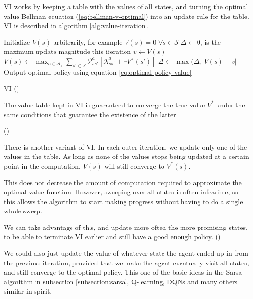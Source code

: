 \ac{VI} works by keeping a table with the values of all states, and
turning the optimal value Bellman equation (\ref{eq:bellman-v-optimal}) into an
update rule for the table. \ac{VI} is described in algorithm
\ref{alg:value-iteration}.

\begin{algorithm}
\begin{algorithmic}
\State Initialize $V(s)$ arbitrarily, for example $V(s)=0 \; \forall s\in\mathcal{S}$
\Repeat
  \State $\Delta \gets 0$, is the maximum update magnitude this iteration
    \State $v \gets V(s)$
    \State $V(s) \gets \max_{a\in\mathcal{A}_s}\sum_{s' \in \mathcal{S}}\mathcal{P}^a_{ss'} \left[\mathcal{R}^a_{ss'} + \gamma V^\pi(s') \right]$
    \State $\Delta \gets \max(\Delta, \left|V(s) - v \right| $
    \EndFor
{}
\State Output optimal policy using equation \ref{eq:optimal-policy-value}
\end{algorithmic}
\caption{\acl{VI} (\cite[Section~4.4]{sutton1998introduction})}
\label{alg:value-iteration}
\end{algorithm}

The value table kept in \ac{VI} is guaranteed to converge the true value $V^*$
under the same conditions that guarantee the existence of the latter

(\cite[Section~4.4]{sutton1998introduction})

There is another variant of \acl{VI}. In each outer iteration, we update only
one of the values in the table. As long as none of the values stops being
updated at a certain point in the computation, $V(s)$ will still converge to $V^*(s)$.

This does not decrease the amount of computation required to approximate the
optimal value function. However, sweeping over all states is often infeasible,
so this allows the algorithm to start making progress without having to do a
single whole sweep.

We can take advantage of this, and update more often the more promising states,
to be able to terminate \acl{VI} earlier and still have a good enough policy.
(\cite[Section~4.5]{sutton1998introduction})

 We could also just update the value of whatever state the agent ended up in
from the previous iteration, provided that we make the agent eventually visit
all states, and still converge to the optimal policy. This one of the basic
ideas in the Sarsa algorithm in subsection \ref{subsection:sarsa}, Q-learning,
\aclp{DQN} and many others similar in spirit.

